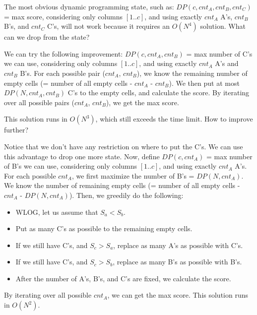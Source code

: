 The most obvious dynamic programming state, such as: $DP(c, cnt_A, cnt_B, cnt_C)$ = max score, considering only columns $[1..c]$, and using exactly $cnt_A$ A's, $cnt_B$ B's, and $cnt_C$ C's, will not work because it requires an $O(N^4)$ solution. What can we drop from the state?

We can try the following improvement: $DP(c, cnt_A, cnt_B)$ = max number of C's we can use, considering only columns $[1..c]$, and using exactly $cnt_A$ A's and $cnt_B$ B's. For each possible pair ($cnt_A$, $cnt_B$), we know the remaining number of empty cells (= number of all empty cells - $cnt_A$ - $cnt_B$). We then put at most $DP(N, cnt_A, cnt_B)$ C's to the empty cells, and calculate the score. By iterating over all possible pairs ($cnt_A$, $cnt_B$), we get the max score.

This solution runs in $O(N^3)$, which still exceeds the time limit. How to improve further?

Notice that we don't have any restriction on where to put the C's. We can use this advantage to drop one more state. Now, define $DP(c, cnt_A)$ = max number of B's we can use, considering only columns $[1..c]$, and using exactly $cnt_A$ A's. For each possible $cnt_A$, we first maximize the number of B's = $DP(N, cnt_A)$. We know the number of remaining empty cells (= number of all empty cells - $cnt_A$ - $DP(N, cnt_A)$). Then, we greedily do the following:

\begin{itemize}
  \item WLOG, let us assume that $S_a < S_b$.
  \item Put as many C's as possible to the remaining empty cells.
  \item If we still have C's, and $S_c > S_a$, replace as many A's as possible with C's.
  \item If we still have C's, and $S_c > S_b$, replace as many B's as possible with B's.
  \item After the number of A's, B's, and C's are fixed, we calculate the score.
\end{itemize}

By iterating over all possible $cnt_A$, we can get the max score. This solution runs in $O(N^2)$.
